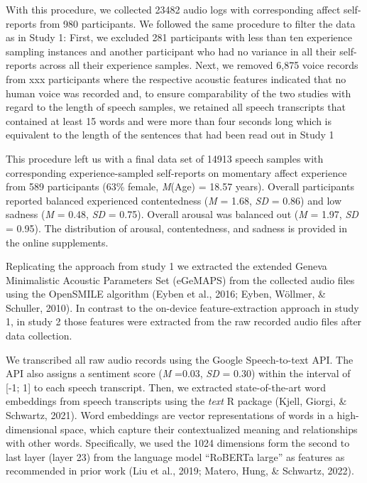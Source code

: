 \documentclass[
  english,
  man,floatsintext]{apa6}
\begin{document}
With this procedure, we collected 23482 audio logs with corresponding affect self-reports from 980 participants. We followed the same procedure to filter the data as in Study 1: First, we excluded 281 participants with less than ten experience sampling instances and another participant who had no variance in all their self-reports across all their experience samples. Next, we removed 6,875 voice records from xxx participants where the respective acoustic features indicated that no human voice was recorded and, to ensure comparability of the two studies with regard to the length of speech samples, we retained all speech transcripts that contained at least 15 words and were more than four seconds long which is equivalent to the length of the sentences that had been read out in Study 1

This procedure left us with a final data set of 14913 speech samples with corresponding experience-sampled self-reports on momentary affect experience from 589 participants (63\% female, \emph{M}(Age) = 18.57 years). Overall participants reported balanced experienced contentedness (\emph{M} = 1.68, \emph{SD} = 0.86) and low sadness (\emph{M} = 0.48, \emph{SD} = 0.75). Overall arousal was balanced out (\emph{M} = 1.97, \emph{SD} = 0.95). The distribution of arousal, contentedness, and sadness is provided in the online supplements.

Replicating the approach from study 1 we extracted the extended Geneva Minimalistic Acoustic Parameters Set (eGeMAPS) from the collected audio files using the OpenSMILE algorithm (Eyben et al., 2016; Eyben, Wöllmer, \& Schuller, 2010). In contrast to the on-device feature-extraction approach in study 1, in study 2 those features were extracted from the raw recorded audio files after data collection.

We transcribed all raw audio records using the Google Speech-to-text API. The API also assigns a sentiment score (\emph{M} =0.03, \emph{SD} = 0.30) within the interval of {[}-1; 1{]} to each speech transcript. Then, we extracted state-of-the-art word embeddings from speech transcripts using the \emph{text} R package (Kjell, Giorgi, \& Schwartz, 2021). Word embeddings are vector representations of words in a high-dimensional space, which capture their contextualized meaning and relationships with other words. Specifically, we used the 1024 dimensions form the second to last layer (layer 23) from the language model ``RoBERTa large'' as features as recommended in prior work (Liu et al., 2019; Matero, Hung, \& Schwartz, 2022).
\end{document}
